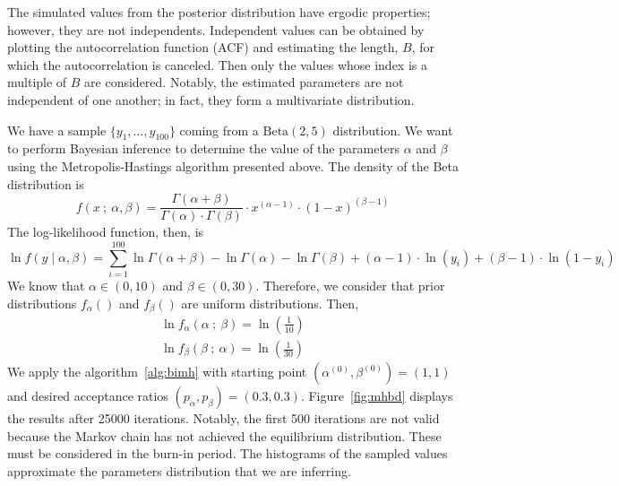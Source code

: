 \documentclass[11pt,fleqn]{book} %
\begin{document}
The simulated values from the posterior distribution have ergodic properties;
however, they are not independents. Independent values can be obtained by 
plotting the autocorrelation function (ACF) and estimating the length, $B$, 
for which the autocorrelation is canceled. Then only the values whose index 
is a multiple of $B$ are considered. Notably, the estimated parameters are 
not independent of one another; in fact, they form a multivariate distribution.

\begin{example}
	We have a sample $\{y_1,\dots,y_{100}\}$ coming from a $\text{Beta}(2,5)$ 
	distribution. We want to perform Bayesian inference to determine the value 
	of the parameters $\alpha$ and $\beta$ using the Metropolis-Hastings 
	algorithm presented above. The density of the Beta distribution is
	\begin{displaymath}
		f(x\ ;\ \alpha, \beta) = 
		\frac{\Gamma(\alpha+\beta)}{\Gamma(\alpha) \cdot \Gamma(\beta)} 
		\cdot x^{(\alpha-1)} \cdot (1-x)^{(\beta-1)}
	\end{displaymath}
	The log-likelihood function, then, is
	\begin{displaymath}
		\ln f(y \mid \alpha, \beta) = 
		\displaystyle \sum_{i=1}^{100} 
		\ln \Gamma(\alpha+\beta) - \ln \Gamma(\alpha) - \ln \Gamma(\beta) +
		(\alpha-1) \cdot \ln(y_i) + (\beta-1) \cdot \ln(1-y_i)
	\end{displaymath}
	We know that $\alpha \in (0,10)$ and $\beta \in (0,30)$. Therefore, we 
	consider that prior distributions $f_{\alpha}()$ and $f_{\beta}()$ are 
	uniform distributions. Then,
	\begin{displaymath}
		\begin{array}{l}
			\ln f_{\alpha}(\alpha \ ;\ \beta) = \ln(\frac{1}{10})
			\\
			\ln f_{\beta}(\beta \ ;\ \alpha) = \ln(\frac{1}{30})
		\end{array}
	\end{displaymath}
	We apply the algorithm~\ref{alg:bimh} with starting point 
	$\left(\alpha^{(0)},\beta^{(0)}\right)=(1,1)$ and 
	desired acceptance ratios $(p_{\alpha},p_{\beta})=(0.3,0.3)$.
	Figure~\ref{fig:mhbd} displays the results after \num{25000} iterations.
	Notably, the first 500 iterations are not valid because the Markov 
	chain has not achieved the equilibrium distribution. These must be 
	considered in the burn-in period. The histograms of the sampled values
	approximate the parameters distribution that we are inferring.
\end{example}
\end{document}

